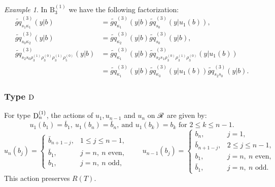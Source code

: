 \documentclass[a4paper]{amsart}
\newcommand{\koushik}[1]{\todo[size=\tiny,color=green!30]{#1}}
\newcommand{\smark}[1]{\todo[size=\tiny,color=cyan!30]{#1}}
\theoremstyle{remark}
\newtheorem{example}[thm]{Example}
\numberwithin{equation}{section}
\begin{document}
\begin{example}
    In $\mathrm{B}_3^{(1)}$ we 
    have the following factorization:
\begin{align*}
   \widetilde{gq}^{(3)}_{s_1\kappa_1}(y| b)&=\widetilde{gq}^{(3)}_{\kappa_1}(y| b)\widetilde{gq}^{(3)}_{s_0}(y| u_1(b)),\\
   \widetilde{gq}^{(3)}_{s_0\kappa_2}(y| b)&=\widetilde{gq}^{(3)}_{\kappa_2}(y| b)\widetilde{gq}^{(3)}_{s_0}(y| b),\\ 
\widetilde{gq}^{(3)}_{s_2s_0\rho_3^{(1)}\rho_3^{(0)}\rho_3^{(1)}\rho_5^{(0)}}(y| b)&=\widetilde{gq}^{(3)}_{\kappa_1}(y| b)\widetilde{gq}^{(3)}_{s_2s_1\rho_3^{(0)}\rho_3^{(1)}\rho_3^{(0)}}(y| u_1(b))\\
   &=\widetilde{gq}^{(3)}_{\kappa_1}(y| b)\widetilde{gq}^{(3)}_{\kappa_3}(y| u_1(b))\widetilde{gq}^{(3)}_{s_2s_0}(y| b).
\end{align*}
\end{example}





\subsubsection*{Type $\mathrm{D}_{}$} For type $\mathrm{D}_{n}^{(1)}$, the actions of $u_1,u_{n-1}$ and $u_n$ on $\mathscr{R}$ are given by:
\begin{equation*}u_1(b_1)=\bar{b}_1, ~u_1(b_n)=\bar{b}_n,~\text{and $u_1(b_k)=b_k$ for $2\le k\le n-1$}.
\end{equation*}
\[u_n(b_j)=
\begin{cases}
\bar b_{n+1-j},&1\le j\le n-1,\\
\bar b_1,&j=n,\ n\text{ even},\\
b_1,&j=n,\ n\text{ odd},
\end{cases}
\qquad
u_{n-1}(b_j)=
\begin{cases}
b_n,&j=1,\\
\bar b_{n+1-j},&2\le j\le n-1,\\
b_1,&j=n,\ n\text{ even},\\
\bar b_1,&j=n,\ n\text{ odd.}
\end{cases}
\]
This action preserves \(R(T)\).
\end{document}
